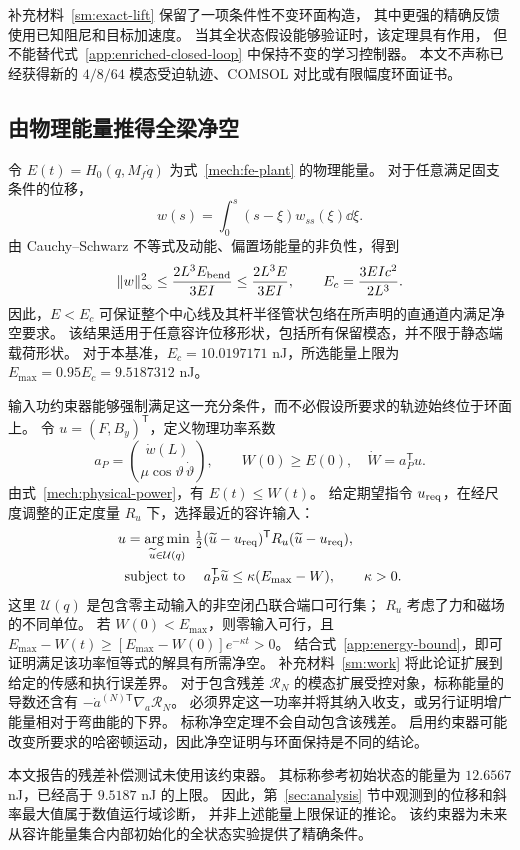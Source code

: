 补充材料~\ref{sm:exact-lift} 保留了一项条件性不变环面构造，
其中更强的精确反馈使用已知阻尼和目标加速度。
当其全状态假设能够验证时，该定理具有作用，
但不能替代式~\eqref{app:enriched-closed-loop} 中保持不变的学习控制器。
本文不声称已经获得新的 $4/8/64$ 模态受迫轨迹、COMSOL 对比或有限幅度环面证书。

\subsection{由物理能量推得全梁净空}
\label{app:clearance}
令 $E(t)=H_0(q,M_f\dot q)$ 为式~\eqref{mech:fe-plant} 的物理能量。
对于任意满足固支条件的位移，
\begin{equation}
 w(s)=\int_0^s(s-\xi)w_{ss}(\xi)\dd\xi.
 \label{app:clamped-identity}
\end{equation}
由 Cauchy--Schwarz 不等式及动能、偏置场能量的非负性，得到
\begin{equation}
 \|w\|_\infty^2\le\frac{2L^3E_{\rm bend}}{3EI}
                    \le\frac{2L^3E}{3EI},\qquad
 E_c=\frac{3EIc^2}{2L^3}.
 \label{app:energy-bound}
\end{equation}
因此，$E<E_c$ 可保证整个中心线及其杆半径管状包络在所声明的直通道内满足净空要求。
该结果适用于任意容许位移形状，包括所有保留模态，并不限于静态端载荷形状。
对于本基准，$E_c=10.0197171$ nJ，所选能量上限为
$E_{\max}=0.95E_c=9.5187312$ nJ。

输入功约束器能够强制满足这一充分条件，而不必假设所要求的轨迹始终位于环面上。
令 $u=(F,B_y)^{\mathsf T}$，定义物理功率系数
\begin{equation}
 a_P=\binom{\dot w(L)}{\mu\cos\vartheta\,\dot\vartheta},\qquad
 W(0)\ge E(0),\quad \dot W=a_P^{\mathsf T}u.
 \label{app:work-observer}
\end{equation}
由式~\eqref{mech:physical-power}，有 $E(t)\le W(t)$。
给定期望指令 $u_{\rm req}$，在经尺度调整的正定度量 $R_u$ 下，选择最近的容许输入：
\begin{align}
 u=\mathop{\arg\min}_{\widetilde u\in\mathcal U(q)}
       &\ \tfrac12(\widetilde u-u_{\rm req})^{\mathsf T}
                 R_u(\widetilde u-u_{\rm req}),\nonumber\\
 \text{subject to }&\quad
 a_P^{\mathsf T}\widetilde u\le\kappa(E_{\max}-W),
 \qquad \kappa>0.
 \label{app:work-governor}
\end{align}
这里 $\mathcal U(q)$ 是包含零主动输入的非空闭凸联合端口可行集；
$R_u$ 考虑了力和磁场的不同单位。
若 $W(0)<E_{\max}$，则零输入可行，且
$E_{\max}-W(t)\ge[E_{\max}-W(0)]e^{-\kappa t}>0$。
结合式~\eqref{app:energy-bound}，即可证明满足该功率恒等式的解具有所需净空。
补充材料~\ref{sm:work} 将此论证扩展到给定的传感和执行误差界。
对于包含残差 $\mathcal R_N$ 的模态扩展受控对象，标称能量的导数还含有
$-\dot a^{(N)\mathsf T}\nabla_a\mathcal R_N$。
必须界定这一功率并将其纳入收支，或另行证明增广能量相对于弯曲能的下界。
标称净空定理不会自动包含该残差。
启用约束器可能改变所要求的哈密顿运动，因此净空证明与环面保持是不同的结论。

本文报告的残差补偿测试未使用该约束器。
其标称参考初始状态的能量为 $12.6567$ nJ，已经高于 $9.5187$ nJ 的上限。
因此，第~\ref{sec:analysis} 节中观测到的位移和斜率最大值属于数值运行域诊断，
并非上述能量上限保证的推论。
该约束器为未来从容许能量集合内部初始化的全状态实验提供了精确条件。
